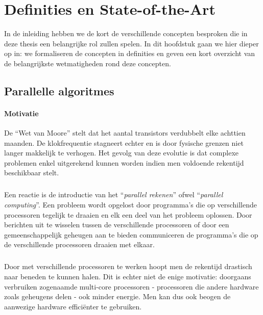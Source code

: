\chapter{Definities en State-of-the-Art}
\label{hoofdstuk:1}

In de inleiding hebben we de kort de verschillende concepten besproken die in deze thesis een belangrijke rol zullen spelen. In dit hoofdstuk gaan we hier dieper op in: we formaliseren de concepten in definities en geven een kort overzicht van de belangrijkste wetmatigheden rond deze concepten.

\section{Parallelle algoritmes}

\subsubsection{Motivatie}

De ``Wet van Moore''\cite{4785860} stelt dat het aantal transistors verdubbelt elke achttien maanden. De klokfrequentie stagneert echter en is door fysische grenzen niet langer makkelijk te verhogen. Het gevolg van deze evolutie is dat complexe problemen enkel uitgerekend kunnen worden indien men voldoende rekentijd beschikbaar stelt.

\paragraph{}
Een reactie is de introductie van het ``\emph{parallel rekenen}'' ofwel ``\emph{parallel computing}''. Een probleem wordt opgelost door programma's die op verschillende processoren tegelijk te draaien en elk een deel van het probleem oplossen. Door berichten uit te wisselen tussen de verschillende processoren of door een gemeenschappelijk geheugen aan te bieden communiceren de programma's die op de verschillende processoren draaien met elkaar.

\paragraph{}
Door met verschillende processoren te werken hoopt men de rekentijd drastisch naar beneden te kunnen halen. Dit is echter niet de enige motivatie: doorgaans verbruiken zogenaamde multi-core processoren - processoren die andere hardware zoals geheugens delen - ook minder energie. Men kan dus ook beogen de aanwezige hardware effici\"enter te gebruiken.

